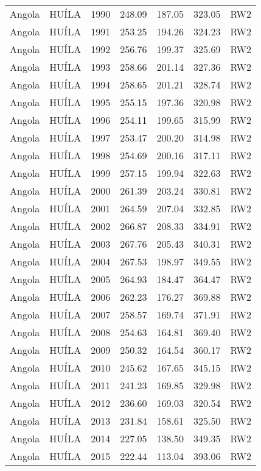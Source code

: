 \begin{longtable}{lllrrrl}
  Angola & HUÍLA & 1990 & 248.09 & 187.05 & 323.05 & RW2 \\ 
  Angola & HUÍLA & 1991 & 253.25 & 194.26 & 324.23 & RW2 \\ 
  Angola & HUÍLA & 1992 & 256.76 & 199.37 & 325.69 & RW2 \\ 
  Angola & HUÍLA & 1993 & 258.66 & 201.14 & 327.36 & RW2 \\ 
  Angola & HUÍLA & 1994 & 258.65 & 201.21 & 328.74 & RW2 \\ 
  Angola & HUÍLA & 1995 & 255.15 & 197.36 & 320.98 & RW2 \\ 
  Angola & HUÍLA & 1996 & 254.11 & 199.65 & 315.99 & RW2 \\ 
  Angola & HUÍLA & 1997 & 253.47 & 200.20 & 314.98 & RW2 \\ 
  Angola & HUÍLA & 1998 & 254.69 & 200.16 & 317.11 & RW2 \\ 
  Angola & HUÍLA & 1999 & 257.15 & 199.94 & 322.63 & RW2 \\ 
  Angola & HUÍLA & 2000 & 261.39 & 203.24 & 330.81 & RW2 \\ 
  Angola & HUÍLA & 2001 & 264.59 & 207.04 & 332.85 & RW2 \\ 
  Angola & HUÍLA & 2002 & 266.87 & 208.33 & 334.91 & RW2 \\ 
  Angola & HUÍLA & 2003 & 267.76 & 205.43 & 340.31 & RW2 \\ 
  Angola & HUÍLA & 2004 & 267.53 & 198.97 & 349.55 & RW2 \\ 
  Angola & HUÍLA & 2005 & 264.93 & 184.47 & 364.47 & RW2 \\ 
  Angola & HUÍLA & 2006 & 262.23 & 176.27 & 369.88 & RW2 \\ 
  Angola & HUÍLA & 2007 & 258.57 & 169.74 & 371.91 & RW2 \\ 
  Angola & HUÍLA & 2008 & 254.63 & 164.81 & 369.40 & RW2 \\ 
  Angola & HUÍLA & 2009 & 250.32 & 164.54 & 360.17 & RW2 \\ 
  Angola & HUÍLA & 2010 & 245.62 & 167.65 & 345.15 & RW2 \\ 
  Angola & HUÍLA & 2011 & 241.23 & 169.85 & 329.98 & RW2 \\ 
  Angola & HUÍLA & 2012 & 236.60 & 169.03 & 320.54 & RW2 \\ 
  Angola & HUÍLA & 2013 & 231.84 & 158.61 & 325.50 & RW2 \\ 
  Angola & HUÍLA & 2014 & 227.05 & 138.50 & 349.35 & RW2 \\ 
  Angola & HUÍLA & 2015 & 222.44 & 113.04 & 393.06 & RW2 \\ 

\end{longtable}
